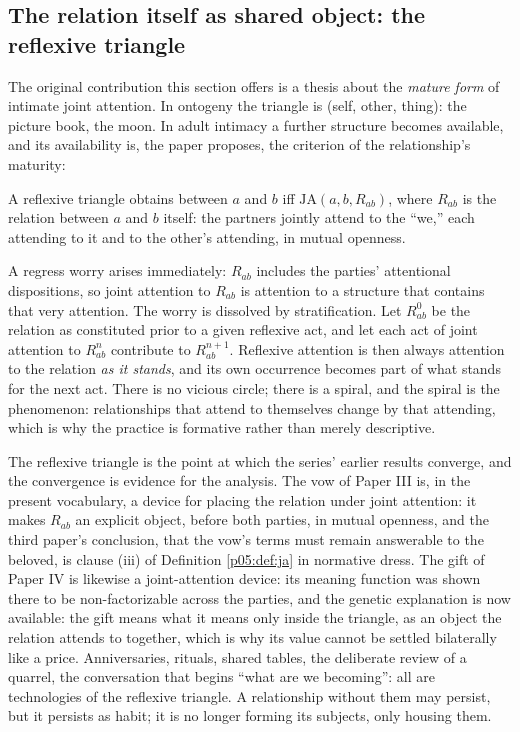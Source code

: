 \subsection{The relation itself as shared object: the reflexive triangle}
\label{p05:sec:reflexive}

The original contribution this section offers is a thesis about the \emph{mature form} of intimate joint attention. In ontogeny the triangle is (self, other, thing): the picture book, the moon. In adult intimacy a further structure becomes available, and its availability is, the paper proposes, the criterion of the relationship's maturity:

\begin{defn}\label{p05:def:reflexive}
A reflexive triangle obtains between $a$ and $b$ iff $\mathrm{JA}(a,b,R_{ab})$, where $R_{ab}$ is the relation between $a$ and $b$ itself: the partners jointly attend to the ``we,'' each attending to it and to the other's attending, in mutual openness.
\end{defn}

A regress worry arises immediately: $R_{ab}$ includes the parties' attentional dispositions, so joint attention to $R_{ab}$ is attention to a structure that contains that very attention. The worry is dissolved by stratification. Let $R^{0}_{ab}$ be the relation as constituted prior to a given reflexive act, and let each act of joint attention to $R^{n}_{ab}$ contribute to $R^{n+1}_{ab}$. Reflexive attention is then always attention to the relation \emph{as it stands}, and its own occurrence becomes part of what stands for the next act. There is no vicious circle; there is a spiral, and the spiral is the phenomenon: relationships that attend to themselves change by that attending, which is why the practice is formative rather than merely descriptive.

The reflexive triangle is the point at which the series' earlier results converge, and the convergence is evidence for the analysis. The vow of Paper III is, in the present vocabulary, a device for placing the relation under joint attention: it makes $R_{ab}$ an explicit object, before both parties, in mutual openness, and the third paper's conclusion, that the vow's terms must remain answerable to the beloved, is clause (iii) of Definition \ref{p05:def:ja} in normative dress. The gift of Paper IV is likewise a joint-attention device: its meaning function was shown there to be non-factorizable across the parties, and the genetic explanation is now available: the gift means what it means only inside the triangle, as an object the relation attends to together, which is why its value cannot be settled bilaterally like a price. Anniversaries, rituals, shared tables, the deliberate review of a quarrel, the conversation that begins ``what are we becoming'': all are technologies of the reflexive triangle. A relationship without them may persist, but it persists as habit; it is no longer forming its subjects, only housing them.

